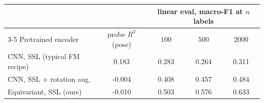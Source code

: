 \begin{tabular}{lcccc}
\toprule
 & & \multicolumn{3}{c}{linear eval, macro-F1 at $n$ labels} \\
\cmidrule(lr){3-5}
Pretrained encoder & probe $R^2$ (pose) & $100$ & $500$ & $2000$ \\
\midrule
  CNN, SSL (typical FM recipe) & 0.183 & 0.283 & 0.264 & 0.311 \\
  CNN, SSL + rotation aug. & -0.004 & 0.408 & 0.457 & 0.484 \\
  Equivariant, SSL (ours) & -0.010 & 0.503 & 0.576 & 0.633 \\
\bottomrule
\end{tabular}